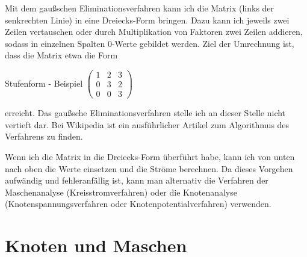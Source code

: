 



Mit dem gaußschen Eliminationsverfahren kann ich die Matrix (links der senkrechten Linie) in eine Dreiecks-Form bringen. Dazu kann ich jeweils zwei Zeilen vertauschen oder durch Multiplikation von Faktoren zwei Zeilen addieren, sodass in einzelnen Spalten 0-Werte gebildet werden. Ziel der Umrechnung ist, dass die Matrix etwa die Form

\begin{frame}{Stufenform - Beispiel}
$\left(
\begin{array}{rrr}
 1 & 2 & 3 \\
 0 & 3 & 2 \\
 0 & 0 & 3
\end{array}
\right)$
\end{frame}

erreicht. Das gaußsche Eliminationsverfahren stelle ich an dieser Stelle nicht vertieft dar. Bei Wikipedia ist ein ausführlicher Artikel zum Algorithmus des Verfahrens zu finden.

Wenn ich die Matrix in die Dreiecks-Form überführt habe, kann ich von unten nach oben die Werte einsetzen und die Ströme berechnen. Da dieses Vorgehen aufwändig und fehleranfällig ist, kann man alternativ die Verfahren der Maschenanalyse (Kreisstromverfahren) oder die Knotenanalyse (Knotenspannungsverfahren oder Knotenpotentialverfahren) verwenden.
\section{Knoten und Maschen}

